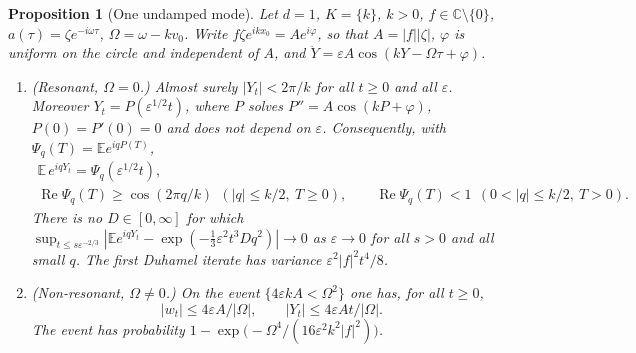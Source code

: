 \documentclass[11pt]{article}
\newcommand{\E}{\mathbb{E}}
\newcommand{\eps}{\varepsilon}
\renewcommand{\Re}{\operatorname{Re}}
\newtheorem{proposition}[theorem]{Proposition}
\theoremstyle{remark}
\begin{document}
\begin{proposition}[One undamped mode]\label{prop:pp}
Let $d=1$, $K=\{k\}$, $k>0$, $f\in\mathbb{C}\setminus\{0\}$,
$a(\tau) = \zeta e^{-i\omega\tau}$, $\Omega = \omega-kv_0$. Write
$f\zeta e^{ikx_0} = Ae^{i\varphi}$, so that $A = |f||\zeta|$,
$\varphi$ is uniform on the circle and independent of $A$, and
$\ddot Y = \eps A\cos(kY-\Omega\tau+\varphi)$.
\begin{enumerate}
\item[(a)] \textup{(Resonant, $\Omega=0$.)} Almost surely $|Y_t|<2\pi/k$ for
  all $t\ge0$ and all $\eps$. Moreover $Y_t = P(\eps^{1/2}t)$, where $P$
  solves $P'' = A\cos(kP+\varphi)$, $P(0)=P'(0)=0$ and does not depend on
  $\eps$. Consequently, with $\Psi_q(T) = \E e^{iqP(T)}$,
  \begin{gather*}
    \E\,e^{iqY_t} = \Psi_q(\eps^{1/2}t),\\
    \Re\Psi_q(T)\ge\cos(2\pi q/k)\ \ (|q|\le k/2,\ T\ge0),\qquad
    \Re\Psi_q(T)<1\ \ (0<|q|\le k/2,\ T>0).
  \end{gather*}
  There is no $D\in[0,\infty]$ for which
  $\sup_{t\le s\eps^{-2/3}}|\E e^{iqY_t}-\exp(-\frac13\eps^2t^3Dq^2)|\to0$ as
  $\eps\to0$ for all $s>0$ and all small $q$. The first Duhamel iterate has
  variance $\eps^2|f|^2t^4/8$.
\item[(b)] \textup{(Non-resonant, $\Omega\ne0$.)} On the event
  $\{4\eps kA<\Omega^2\}$ one has, for all $t\ge0$,
  \[
    |w_t|\le4\eps A/|\Omega|,\qquad|Y_t|\le4\eps At/|\Omega| .
  \]
  The event has probability
  $1-\exp\bigl(-\Omega^4/(16\eps^2k^2|f|^2)\bigr)$.
\end{enumerate}
\end{proposition}
\end{document}
